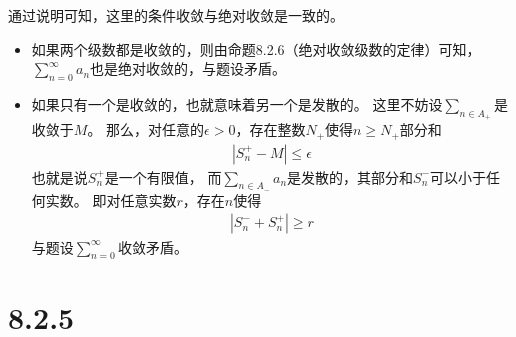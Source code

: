 \documentclass{article}
\begin{document}
通过说明可知，这里的条件收敛与绝对收敛是一致的。

\begin{itemize}
  \item  如果两个级数都是收敛的，则由命题8.2.6（绝对收敛级数的定律）可知，
        $\sum \limits_{n=0}^\infty a_n$也是绝对收敛的，与题设矛盾。
  \item  如果只有一个是收敛的，也就意味着另一个是发散的。
        这里不妨设$\sum \limits_{n \in A_{+}}$是收敛于$M$。
        那么，对任意的$\epsilon > 0$，存在整数$N_{+}$使得$n \geq N_{+}$部分和
        \begin{align*}
          |S_{n}^{+} - M| \leq \epsilon
        \end{align*}
        也就是说$S_{n}^{+}$是一个有限值，
        而$\sum \limits_{n \in A_{-}} a_n$是发散的，其部分和$S_{n}^{-}$可以小于任何实数。
        即对任意实数$r$，存在$n$使得
        \begin{align*}
          |S_{n}^{-} + S_{n}^{+}| \geq r
        \end{align*}
        与题设$\sum \limits_{n=0}^\infty$收敛矛盾。
\end{itemize}

\section*{8.2.5}
\end{document}
